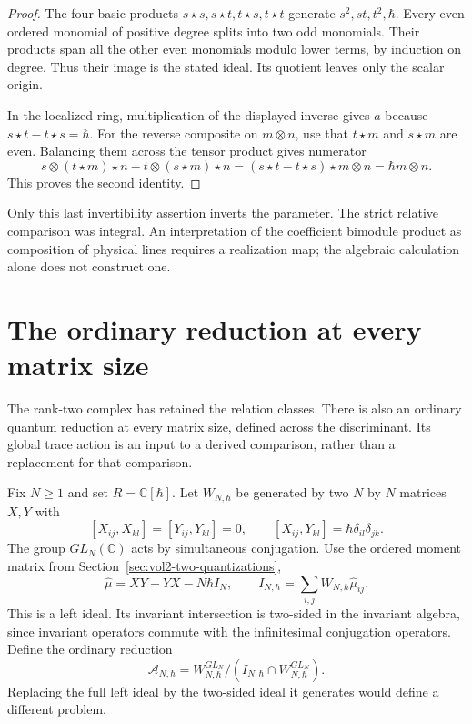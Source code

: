\begin{proof}
The four basic products $s\star s,s\star t,t\star s,t\star t$
generate $s^2,st,t^2,\hbar$. Every even ordered monomial of
positive degree splits into two odd monomials.
Their products span all the other even monomials modulo
lower terms, by induction on degree. Thus their image is
the stated ideal. Its quotient leaves only the scalar origin.

In the localized ring, multiplication of the displayed
inverse gives $a$ because $s\star t-t\star s=\hbar$.
For the reverse composite on $m\otimes n$, use that
$t\star m$ and $s\star m$ are even. Balancing them across
the tensor product gives numerator
\[
 s\otimes(t\star m)\star n
   -t\otimes(s\star m)\star n
  =(s\star t-t\star s)\star m\otimes n
  =\hbar m\otimes n.
\]
This proves the second identity.
\end{proof}

Only this last invertibility assertion inverts the parameter.
The strict relative comparison was integral.
An interpretation of the coefficient bimodule product as
composition of physical lines requires a realization map;
the algebraic calculation alone does not construct one.

\section{The ordinary reduction at every matrix size}
\label{sec:vol2-integral-matrix-reduction}

The rank-two complex has retained the relation classes.
There is also an ordinary quantum reduction at every matrix
size, defined across the discriminant. Its global trace
action is an input to a derived comparison, rather than
a replacement for that comparison.

Fix $N\geq1$ and set $R=\mathbb C[\hbar]$.
Let $W_{N,\hbar}$ be generated by two $N$ by $N$ matrices
$X,Y$ with
\[
 [X_{ij},X_{kl}]=[Y_{ij},Y_{kl}]=0,\qquad
 [X_{ij},Y_{kl}]=\hbar\delta_{il}\delta_{jk}.
\]
The group $GL_N(\mathbb C)$ acts by simultaneous conjugation.
Use the ordered moment matrix from
Section~\ref{sec:vol2-two-quantizations},
\[
 \widehat\mu=XY-YX-N\hbar I_N,
 \qquad
 I_{N,\hbar}=\sum_{i,j}W_{N,\hbar}\widehat\mu_{ij}.
\]
This is a left ideal. Its invariant intersection is
two-sided in the invariant algebra, since invariant
operators commute with the infinitesimal conjugation
operators. Define the ordinary reduction
\begin{equation}\label{eq:vol2-ordinary-matrix-reduction}
 \mathcal A_{N,\hbar}
 =W_{N,\hbar}^{GL_N}/
       (I_{N,\hbar}\cap W_{N,\hbar}^{GL_N}).
\end{equation}
Replacing the full left ideal by the two-sided ideal it
generates would define a different problem.

